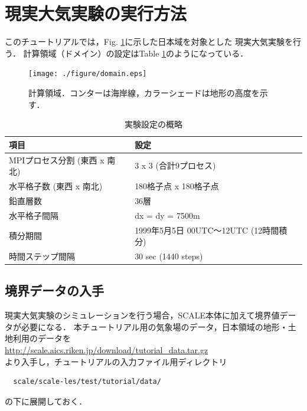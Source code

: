 \section{現実大気実験の実行方法}

このチュートリアルでは，Fig. \ref{fig:domain}に示した日本域を対象とした
現実大気実験を行う．
計算領域（ドメイン）の設定はTable \ref{tab:grids}のようになっている．

\begin{figure}[h]
\begin{center}
  \texttt{[image: ./figure/domain.eps]}\\
  \caption{計算領域．コンターは海岸線，カラーシェードは地形の高度を示す．}
  \label{fig:domain}
\end{center}
\end{figure}

\begin{table}[h]
\begin{center}
  \caption{実験設定の概略}
  \label{tab:grids}
  \begin{tabularx}{150mm}{|l|X|} \hline
    \rowcolor[gray]{0.9} 項目 & 設定 \\ \hline
    MPIプロセス分割 (東西 x 南北) & 3 x 3 (合計9プロセス) \\ \hline
    水平格子数 (東西 x 南北) & 180格子点 x 180格子点 \\ \hline
    鉛直層数                 & 36層                  \\ \hline
    水平格子間隔             & dx = dy = 7500m       \\ \hline
    積分期間 & 1999年5月5日 00UTC～12UTC (12時間積分) \\ \hline
    時間ステップ間隔 & 30 sec (1440 steps) \\ \hline
  \end{tabularx}
\end{center}
\end{table}


\subsection{境界データの入手}

現実大気実験のシミュレーションを行う場合，SCALE本体に加えて境界値データが必要になる．
本チュートリアル用の気象場のデータ，日本領域の地形・土地利用のデータを\\
 \url{http://scale.aics.riken.jp/download/tutorial_data.tar.gz}\\
より入手し，チュートリアルの入力ファイル用ディレクトリ
\begin{verbatim}
  scale/scale-les/test/tutorial/data/
\end{verbatim}
の下に展開しておく．

